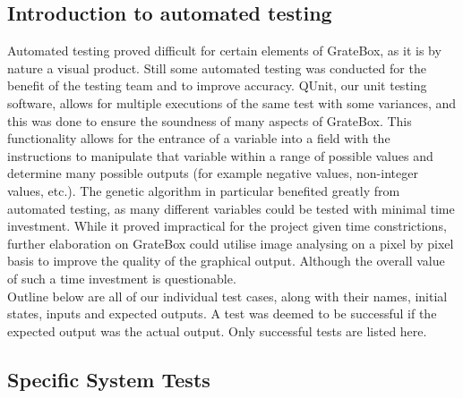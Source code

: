 \documentclass[12pt, titlepage]{article}
\begin{document}
\subsection{Introduction to automated testing}

Automated testing proved difficult for certain elements of GrateBox, as it is 
by nature a visual product. Still some automated testing was conducted for the 
benefit of the testing team and to improve accuracy. QUnit, our unit testing 
software, allows for multiple executions of the same test with some variances, 
and this was done to ensure the soundness of many aspects of GrateBox. This 
functionality allows for the entrance of a variable into a field with the 
instructions to manipulate that variable within a range of possible values and 
determine many possible outputs (for example negative values, non-integer 
values, etc.). The genetic algorithm in particular benefited greatly from 
automated testing, as many different variables could be tested with minimal time 
investment. While it proved impractical for the project given time 
constrictions, further elaboration on GrateBox could utilise image analysing on 
a pixel by pixel basis to improve the quality of the graphical output. Although 
the overall value of such a time investment is questionable.\\

Outline below are all of our individual test cases, along with their names, 
initial states, inputs and expected outputs. A test was deemed to be successful 
if the expected output was the actual output. Only successful tests are listed 
here.

\subsection{Specific System Tests}
\end{document}
